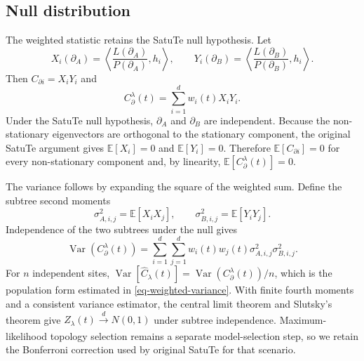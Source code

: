 \subsection*{Null distribution}

The weighted statistic retains the SatuTe null hypothesis. Let
\[
X_i(\partial_A)=\left\langle \frac{L(\partial_A)}{P(\partial_A)},h_i\right\rangle,
\qquad
Y_i(\partial_B)=\left\langle \frac{L(\partial_B)}{P(\partial_B)},h_i\right\rangle .
\]
Then \(C_{\partial i}=X_iY_i\) and
\[
C_{\partial}^{\lambda}(t)=\sum_{i=1}^{d}w_i(t)X_iY_i .
\]
Under the SatuTe null hypothesis, \(\partial_A\) and \(\partial_B\) are independent. Because the non-stationary eigenvectors are orthogonal to the stationary component, the original SatuTe argument gives \(\mathbb{E}[X_i]=0\) and \(\mathbb{E}[Y_i]=0\). Therefore \(\mathbb{E}[C_{\partial i}]=0\) for every non-stationary component and, by linearity, \(\mathbb{E}[C_{\partial}^{\lambda}(t)]=0\).

The variance follows by expanding the square of the weighted sum. Define the subtree second moments
\[
\sigma^2_{A,i,j}
=\mathbb{E}[X_iX_j],
\qquad
\sigma^2_{B,i,j}
=\mathbb{E}[Y_iY_j].
\]
Independence of the two subtrees under the null gives
\begin{equation}
\operatorname{Var}\!\left(C_{\partial}^{\lambda}(t)\right)
=
\sum_{i=1}^{d}\sum_{j=1}^{d}
w_i(t)w_j(t)\sigma^2_{A,i,j}\sigma^2_{B,i,j}.
\label{eq-weighted-null-variance}
\end{equation}
For \(n\) independent sites, \(\operatorname{Var}[\hat C_{\lambda}(t)] =
\operatorname{Var}(C_{\partial}^{\lambda}(t))/n\), which is the population form estimated in \cref{eq-weighted-variance}. With finite fourth moments and a consistent variance estimator, the central limit theorem and Slutsky's theorem give \(Z_{\lambda}(t)\xrightarrow[]{d}N(0,1)\) under subtree independence. Maximum-likelihood topology selection remains a separate model-selection step, so we retain the Bonferroni correction used by original SatuTe for that scenario.
